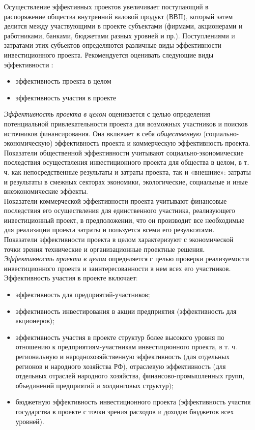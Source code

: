\documentclass[a4paper,12pt]{article}
\begin{document}
\newpage
Осуществление эффективных проектов увеличивает поступающий в
распоряжение общества внутренний валовой продукт (ВВП), который затем делится между участвующими в проекте субъектами (фирмами, акционерами и работниками, банками, бюджетами разных уровней и пр.).
Поступлениями и затратами этих субъектов определяются различные виды эффективности инвестиционного проекта.
Рекомендуется оценивать следующие виды эффективности :
\begin{itemize}
\item эффективность проекта в целом
\item эффективность участия в проекте
\end{itemize}
\textit{Эффективность проекта в целом} оценивается с целью определения потенциальной привлекательности проекта для возможных участников и поисков источников финансирования. Она включает в себя \textit{общественную} (социально-экономическую) эффективность проекта и коммерческую эффективность проекта.
Показатели общественной эффективности учитывают социально-экономические последствия осуществления инвестиционного проекта для общества в целом, в т. ч. как непосредственные результаты и затраты
проекта, так и «внешние»: затраты и результаты в смежных секторах
экономики, экологические, социальные и иные внеэкономические эффекты.\\
Показатели коммерческой эффективности проекта учитывают финансовые последствия его осуществления для единственного участника, реализующего инвестиционный проект, в предположении, что он производит все необходимые для реализации проекта затраты и пользуется всеми его результатами.\\
Показатели эффективности проекта в целом характеризуют с
экономической точки зрения технические и организационные проектные решения.\\
\textit{Эффективность проекта в целом} определяется с целью проверки
реализуемости инвестиционного проекта и заинтересованности в нем всех
его участников.\\
Эффективность участия в проекте включает:
\begin{itemize}
\item эффективность для предприятий-участников;
\item эффективность инвестирования в акции предприятия (эффективность для акционеров);
\item эффективность участия в проекте структур более высокого уровня
по отношению к предприятиям-участникам инвестиционного проекта, в
т. ч. региональную и народнохозяйственную эффективность (для отдельных регионов и народного хозяйства РФ), отраслевую эффективность
(для отдельных отраслей народного хозяйства, финансово-промышленных групп, объединений предприятий и холдинговых структур);
\item бюджетную эффективность инвестиционного проекта (эффективность участия государства в проекте с точки зрения расходов и доходов бюджетов всех уровней).
\end{itemize}
\end{document}
